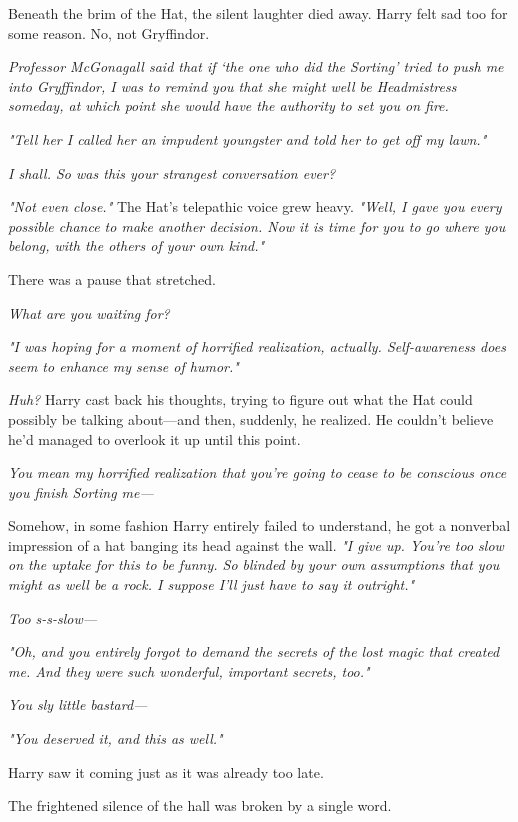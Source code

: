 Beneath the brim of the Hat, the silent laughter died away. Harry felt sad too
for some reason. No, not Gryffindor.

\emph{Professor McGonagall said that if `the one who did the Sorting' tried to
push me into Gryffindor, I was to remind you that she might well be
Headmistress someday, at which point she would have the authority to set you on
fire.}

\emph{"Tell her I called her an impudent youngster and told her to get off my
lawn."}

\emph{I shall. So was this your strangest conversation ever?}

\emph{"Not even close."} The Hat's telepathic voice grew heavy. \emph{"Well, I
gave you every possible chance to make another decision. Now it is time for you
to go where you belong, with the others of your own kind."}

There was a pause that stretched.

\emph{What are you waiting for?}

\emph{"I was hoping for a moment of horrified realization, actually.
Self-awareness does seem to enhance my sense of humor."}

\emph{Huh?} Harry cast back his thoughts, trying to figure out what the Hat
could possibly be talking about---and then, suddenly, he realized. He couldn't
believe he'd managed to overlook it up until this point.

\emph{You mean my horrified realization that you're going to cease to be
conscious once you finish Sorting me---}

Somehow, in some fashion Harry entirely failed to understand, he got a
nonverbal impression of a hat banging its head against the wall. \emph{"I give
up. You're too slow on the uptake for this to be funny. So blinded by your own
assumptions that you might as well be a rock. I suppose I'll just have to say
it outright."}

\emph{Too s-s-slow---}

\emph{"Oh, and you entirely forgot to demand the secrets of the lost magic that
created me. And they were such wonderful, important secrets, too."}

\emph{You sly little bastard---}

\emph{"You deserved it, and this as well."}

Harry saw it coming just as it was already too late.

The frightened silence of the hall was broken by a single word.

